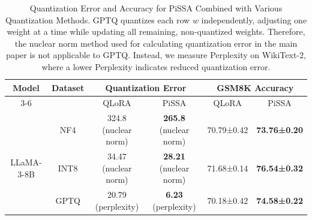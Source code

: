 \begin{table}[htbp]
\centering
\caption{Quantization Error and Accuracy for PiSSA Combined with Various Quantization Methods. GPTQ quantizes each row $w$ independently, adjusting one weight at a time while updating all remaining, non-quantized weights. Therefore, the nuclear norm method used for calculating quantization error in the main paper is not applicable to GPTQ. Instead, we measure Perplexity on WikiText-2, where a lower Perplexity indicates reduced quantization error.}
\small
\begin{tabular}{c|c|cc|cc}
\toprule
\multirow{2}{*}{Model}&\multirow{2}{*}{Dataset}
& \multicolumn{2}{c|}{Quantization Error} & \multicolumn{2}{c}{GSM8K Accuracy} \\
\cline{3-6}
&& QLoRA   & PiSSA   & QLoRA  & PiSSA\\
\midrule
&NF4	& 324.8 (nuclear norm)	& \textbf{265.8} (nuclear norm)	& 70.79±0.42	& \textbf{73.76±0.20}\\
LLaMA-3-8B&INT8 & 34.47 (nuclear norm)	& \textbf{28.21} (nuclear norm)	& 71.68±0.14	& \textbf{76.54±0.32}\\
&GPTQ	& 20.79 (perplexity)	& \textbf{6.23} (perplexity)	& 70.18±0.42	& \textbf{74.58±0.22}\\
\bottomrule
\end{tabular}
\label{table: apdix-nf4_int8_gptq}
\end{table}